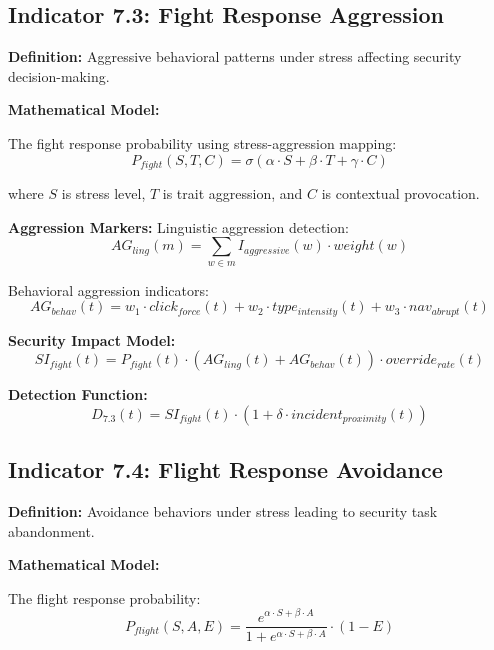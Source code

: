 \documentclass[11pt,a4paper]{article}
\begin{document}
\subsection{Indicator 7.3: Fight Response Aggression}

\textbf{Definition:} Aggressive behavioral patterns under stress affecting security decision-making.

\textbf{Mathematical Model:}

The fight response probability using stress-aggression mapping:
\begin{equation}
P_{fight}(S,T,C) = \sigma(\alpha \cdot S + \beta \cdot T + \gamma \cdot C)
\end{equation}

where $S$ is stress level, $T$ is trait aggression, and $C$ is contextual provocation.

\textbf{Aggression Markers:}
Linguistic aggression detection:
\begin{equation}
AG_{ling}(m) = \sum_{w \in m} I_{aggressive}(w) \cdot weight(w)
\end{equation}

Behavioral aggression indicators:
\begin{equation}
AG_{behav}(t) = w_1 \cdot click_{force}(t) + w_2 \cdot type_{intensity}(t) + w_3 \cdot nav_{abrupt}(t)
\end{equation}

\textbf{Security Impact Model:}
\begin{equation}
SI_{fight}(t) = P_{fight}(t) \cdot (AG_{ling}(t) + AG_{behav}(t)) \cdot override_{rate}(t)
\end{equation}

\textbf{Detection Function:}
\begin{equation}
D_{7.3}(t) = SI_{fight}(t) \cdot \left(1 + \delta \cdot incident_{proximity}(t)\right)
\end{equation}

\subsection{Indicator 7.4: Flight Response Avoidance}

\textbf{Definition:} Avoidance behaviors under stress leading to security task abandonment.

\textbf{Mathematical Model:}

The flight response probability:
\begin{equation}
P_{flight}(S,A,E) = \frac{e^{\alpha \cdot S + \beta \cdot A}}{1 + e^{\alpha \cdot S + \beta \cdot A}} \cdot (1 - E)
\end{equation}
\end{document}
